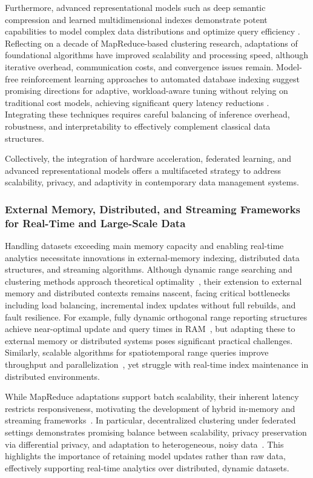 \documentclass[sigconf]{acmart}
\begin{document}
Furthermore, advanced representational models such as deep semantic compression and learned multidimensional indexes demonstrate potent capabilities to model complex data distributions and optimize query efficiency \cite{ref16,ref33}. Reflecting on a decade of MapReduce-based clustering research, adaptations of foundational algorithms have improved scalability and processing speed, although iterative overhead, communication costs, and convergence issues remain. Model-free reinforcement learning approaches to automated database indexing suggest promising directions for adaptive, workload-aware tuning without relying on traditional cost models, achieving significant query latency reductions \cite{ref16,ref33}. Integrating these techniques requires careful balancing of inference overhead, robustness, and interpretability to effectively complement classical data structures.

Collectively, the integration of hardware acceleration, federated learning, and advanced representational models offers a multifaceted strategy to address scalability, privacy, and adaptivity in contemporary data management systems.

\subsubsection{External Memory, Distributed, and Streaming Frameworks for Real-Time and Large-Scale Data}

Handling datasets exceeding main memory capacity and enabling real-time analytics necessitate innovations in external-memory indexing, distributed data structures, and streaming algorithms. Although dynamic range searching and clustering methods approach theoretical optimality~\cite{ref3,ref7}, their extension to external memory and distributed contexts remains nascent, facing critical bottlenecks including load balancing, incremental index updates without full rebuilds, and fault resilience. For example, fully dynamic orthogonal range reporting structures achieve near-optimal update and query times in RAM~\cite{ref3}, but adapting these to external memory or distributed systems poses significant practical challenges. Similarly, scalable algorithms for spatiotemporal range queries improve throughput and parallelization~\cite{ref7}, yet struggle with real-time index maintenance in distributed environments.

While MapReduce adaptations support batch scalability, their inherent latency restricts responsiveness, motivating the development of hybrid in-memory and streaming frameworks~\cite{ref22}. In particular, decentralized clustering under federated settings demonstrates promising balance between scalability, privacy preservation via differential privacy, and adaptation to heterogeneous, noisy data~\cite{ref22}. This highlights the importance of retaining model updates rather than raw data, effectively supporting real-time analytics over distributed, dynamic datasets.
\end{document}
